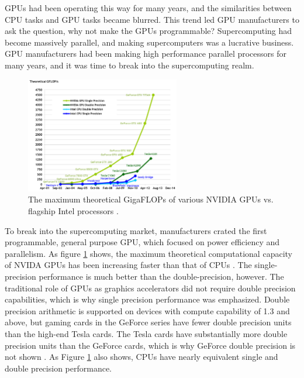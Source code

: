 GPUs had been operating this way for many years, %
and the similarities between CPU tasks and GPU tasks became blurred.%
  This trend led GPU manufacturers to ask the question, why not make the GPUs programmable?  Supercomputing had become massively parallel, and making supercomputers was a lucrative business.  GPU manufacturers had been making high performance parallel processors for many years, and it was time to break into the supercomputing realm.

\begin{figure}[h!] 
  \centering
    \includegraphics[width=0.6\textwidth]{graphics/computational_cap.pdf}
     \caption[The maximum theoretical GigaFLOPs of various NVIDIA GPUs vs. flagship Intel processors.]{The maximum theoretical GigaFLOPs of various NVIDIA GPUs vs. flagship Intel processors \cite{cuda}. \label{computational_cap}}
\end{figure}

To break into the supercomputing market, manufacturers crated the first programmable, general purpose GPU, which focused on power efficiency and parallelism.  As figure \ref{computational_cap} shows, the maximum theoretical computational capacity of NVIDA GPUs has been increasing faster than that of CPUs \cite{cuda}.  The single-precision performance is much better than the double-precision, however.  The traditional role of GPUs as graphics accelerators did not require double precision capabilities, which is why single precision performance was emphasized.  Double precision arithmetic is supported on devices with compute capability of 1.3 and above, %
but gaming cards in the GeForce series have fewer double precision units than the high-end Tesla cards.  The Tesla cards have substantially more double precision units than the GeForce cards, which is why GeForce double precision is not shown \cite{fermi}.  As Figure \ref{computational_cap} also shows, CPUs have nearly equivalent single and double precision performance. 

